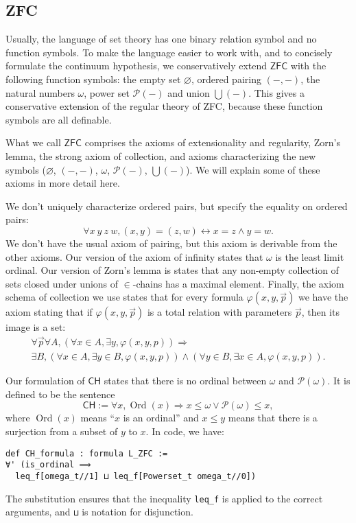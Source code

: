 \documentclass[sigplan,10pt,review, anonymous]{acmart}
\newcommand{\lil}{\lstinline}
\newcommand{\ZFC}{\mathsf{ZFC}}
\newcommand{\CH}{\mathsf{CH}}
\theoremstyle{definition}
\DeclareMathOperator{\Ord}{Ord}
\begin{document}
\subsection{ZFC}
\label{subsect:fol:zfc}

Usually, the language of set theory has one binary relation symbol and no function symbols.
To make the language easier to work with, and to concisely formulate the continuum hypothesis, we conservatively extend \(\ZFC\) with the following function symbols: the empty set \(\varnothing\), ordered pairing \(({-},{-})\), the natural numbers \(\omega\), power set \(\mathcal{P}({-})\) and union \(\bigcup({-})\).
This gives a conservative extension of the regular theory of ZFC, because these function symbols are all definable.

What we call \(\ZFC\) comprises the axioms of extensionality and regularity, Zorn's lemma, the strong axiom of collection, and axioms characterizing the new symbols (\(\varnothing\), \((-,-)\), \(\omega\), \(\mathcal{P}(-)\), \(\bigcup(-)\)). We will explain some of these axioms in more detail here.

We don't uniquely characterize ordered pairs, but specify the equality on ordered pairs:
\[\forall x\ y\ z\ w, (x,y)=(z,w) \leftrightarrow x = z \wedge y = w.\]
We don't have the usual axiom of pairing, but this axiom is derivable from the other axioms.
Our version of the axiom of infinity states that $\omega$ is the least limit ordinal.
Our version of Zorn's lemma is states that any non-empty collection of sets closed under unions of $\in$-chains has a maximal element.
Finally, the axiom schema of collection we use states that for every formula \(\varphi(x,y,\vec p)\) we have the axiom stating that if \(\varphi(x,y,\vec p)\) is a total relation with parameters \(\vec p\), then its image is a set:
\begin{gather*}
\forall \vec p \forall A, (\forall x \in A, \exists y, \varphi(x,y,p)) \Rightarrow\\
\exists B, (\forall x \in A, \exists y \in B, \varphi(x,y,p)) \wedge
(\forall y \in B, \exists x \in A, \varphi(x,y,p)).
\end{gather*}

Our formulation of \(\CH\) states that there is no ordinal between \(\omega\) and \(\mathcal{P}(\omega)\). It is defined to be the sentence
\[\CH:=\forall x, \Ord(x) \Rightarrow x \le \omega \vee \mathcal{P}(\omega) \le x,\]
where \(\Ord(x)\) means ``\(x\) is an ordinal'' and \(x \le y\) means that there is a surjection from a subset of \(y\) to \(x\). In code, we have:
\begin{lstlisting}
def CH_formula : formula L_ZFC :=
∀' (is_ordinal ⟹
  leq_f[omega_t//1] ⊔ leq_f[Powerset_t omega_t//0])
\end{lstlisting}
The substitution ensures that the inequality \lil{leq_f} is applied to the correct arguments, and \lil{⊔} is notation for disjunction.
\end{document}
